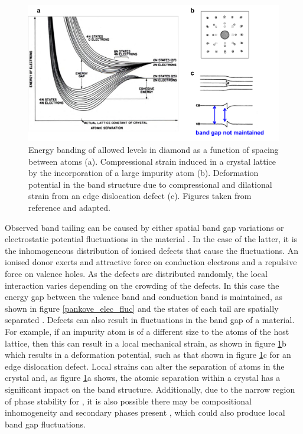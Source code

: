 \documentclass[11pt, twoside]{report}
\begin{document}
\begin{figure}[h!]
  \centering
    \includegraphics[width=1.0\textwidth]{figures/pankove_band_fluc.png}
    \caption{Energy banding of allowed levels in diamond as a function of spacing between atoms (a). Compressional strain induced in a crystal lattice by the incorporation of a large impurity atom (b). Deformation potential in the band structure due to compressional and dilational strain from an edge dislocation defect (c). Figures taken from reference  and adapted.}
  \label{pankove_band_fluc}
\end{figure}

Observed band tailing can be caused by either spatial band gap variations or electrostatic potential fluctuations in the material \cite{band_tail}. In the case of the latter, it is the inhomogeneous distribution of ionised defects that cause the fluctuations. An ionised donor exerts and attractive force on conduction electrons and a repulsive force on valence holes. As the defects are distributed randomly, the local interaction varies depending on the crowding of the defects. In this case the energy gap between the valence band and conduction band is maintained, as shown in figure \ref{pankove_elec_fluc} and the states of each tail are spatially separated \cite{Pankove}. Defects can also result in fluctuations in the band gap of a material. For example, if an impurity atom is of a different size to the atoms of the host lattice, then this can result in a local mechanical strain, as shown in figure \ref{pankove_band_fluc}b which results in a deformation potential, such as that shown in figure \ref{pankove_band_fluc}c for an edge dislocation defect. Local strains can alter the separation of atoms in the crystal and, as figure \ref{pankove_band_fluc}a shows, the atomic separation within a crystal has a significant impact on the band structure. Additionally, due to the narrow region of phase stability for {\CZTS}, it is also possible there may be compositional inhomogeneity and secondary phases present \cite{SandS}, which could also produce local band gap fluctuations. 
\end{document}
